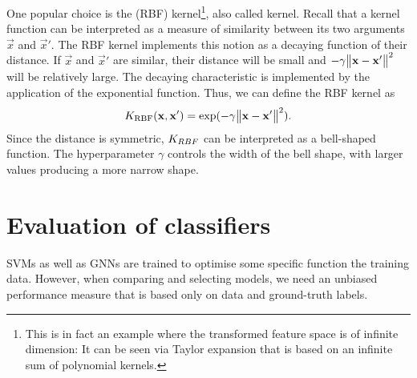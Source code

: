 \documentclass[
	fontsize=10pt, %
	twoside=false, %
	secnumdepth=1, %
  toc=indentunnumbered %
]{kaobook}
\begin{document}
One popular choice is the  (RBF) kernel\footnote{This
  is in fact an example where the transformed feature space is of infinite
  dimension: It can be seen via Taylor expansion that \Krbf is based on an
  infinite sum of polynomial kernels.
}, also called  kernel. Recall that a kernel function can be
interpreted as a measure of similarity between its two arguments $\vec x$ and
$\vec x'$. The RBF kernel implements this notion as a decaying function of their
distance. If $\vec x$ and $\vec x'$ are similar, their distance will be small and $-
\gamma \norm{\mathbf{x} - \mathbf{x}'}^2$ will be relatively large. The decaying
characteristic is implemented by the application of the exponential function.
Thus, we can define the RBF kernel as
\begin{align}
  K_{\text{RBF}} (\mathbf{x}, \mathbf{x}') = \exp( -\gamma \norm{\mathbf{x} - \mathbf{x}'}^2 ).
  \label{eq:rbf-kernel}
\end{align}
Since the distance is symmetric, $K_{RBF}$ can be interpreted as a bell-shaped
function.
The hyperparameter $\gamma$ controls the width of the bell shape, with
larger values producing a more narrow shape. 




\section{Evaluation of classifiers}

SVMs as well as GNNs are trained to optimise some specific function \wrt the
training data. However, when comparing and selecting models, we need an unbiased
performance measure that is based only on data and ground-truth labels.
\end{document}
